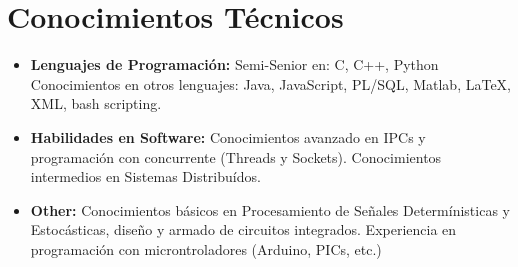 \documentclass[11pt,a4paper,sans]{moderncv}        %
\begin{document}
\section{Conocimientos Técnicos}

\vspace{6pt}

\begin{itemize}

\item \textbf{Lenguajes de Programación:} Semi-Senior en: C, C++, Python \\ Conocimientos en otros lenguajes: Java, JavaScript, PL/SQL, Matlab, LaTeX, XML, bash scripting.

\vspace{6pt}

\item \textbf{Habilidades en Software:} Conocimientos avanzado en IPCs y programación con concurrente (Threads y Sockets). Conocimientos intermedios en Sistemas Distribuídos. 

\vspace{6pt}

\item \textbf{Other:} Conocimientos básicos en Procesamiento de Señales Determínisticas y Estocásticas, diseño y armado de circuitos integrados. Experiencia en programación con microntroladores (Arduino, PICs, etc.)

\end{itemize}





\end{document}
